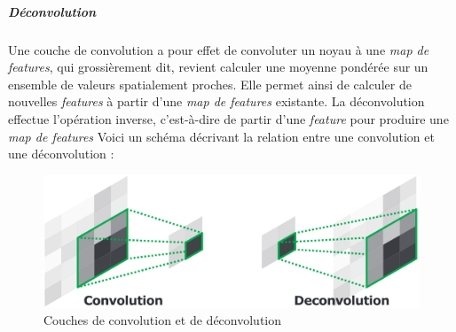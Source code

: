 \documentclass[a4paper, 11pt]{report}
\begin{document}
\subparagraph{Déconvolution}
Une couche de convolution a pour effet de convoluter un noyau à une \emph{map de  features}, qui grossièrement dit, revient calculer une moyenne pondérée sur un ensemble de valeurs spatialement proches.
Elle permet ainsi de calculer de nouvelles \emph{features} à partir d'une \emph{map de features} existante.
La déconvolution effectue l'opération inverse, c'est-à-dire de partir d'une \emph{feature} pour produire une \emph{map de features}
Voici un schéma décrivant la relation entre une convolution et une déconvolution :
\begin{figure}[H]
	\begin{center}
		\includegraphics[scale=0.3]{Images/Deconvolution.png}
		\caption{Couches de convolution et de déconvolution}
	\end{center}
\end{figure}
\end{document}
